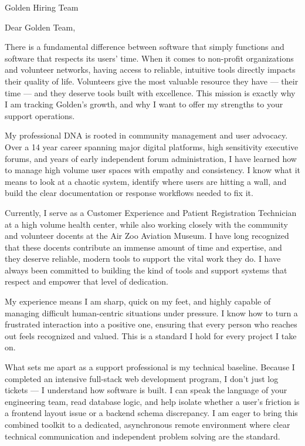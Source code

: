 \documentclass{letter}
\date{\today}
\begin{document}
\begin{letter}
{Golden Hiring Team}
\opening{Dear Golden Team,}

There is a fundamental difference between software that simply functions and software that respects its users' time. When it comes to non-profit organizations and volunteer networks, having access to reliable, intuitive tools directly impacts their quality of life. Volunteers give the most valuable resource they have — their time — and they deserve tools built with excellence. This mission is exactly why I am tracking Golden’s growth, and why I want to offer my strengths to your support operations.

My professional DNA is rooted in community management and user advocacy. Over a 14 year career spanning major digital platforms, high sensitivity executive forums, and years of early independent forum administration, I have learned how to manage high volume user spaces with empathy and consistency. I know what it means to look at a chaotic system, identify where users are hitting a wall, and build the clear documentation or response workflows needed to fix it.

Currently, I serve as a Customer Experience and Patient Registration Technician at a high volume health center, while also working closely with the community and volunteer docents at the Air Zoo Aviation Museum. I have long recognized that these docents contribute an immense amount of time and expertise, and they deserve reliable, modern tools to support the vital work they do. I have always been committed to building the kind of tools and support systems that respect and empower that level of dedication.

My experience means I am sharp, quick on my feet, and highly capable of managing difficult human-centric situations under pressure. I know how to turn a frustrated interaction into a positive one, ensuring that every person who reaches out feels recognized and valued. This is a standard I hold for every project I take on.

What sets me apart as a support professional is my technical baseline. Because I completed an intensive full-stack web development program, I don't just log tickets — I understand how software is built. I can speak the language of your engineering team, read database logic, and help isolate whether a user’s friction is a frontend layout issue or a backend schema discrepancy. I am eager to bring this combined toolkit to a dedicated, asynchronous remote environment where clear technical communication and independent problem solving are the standard.


\end{letter}
\end{document}
